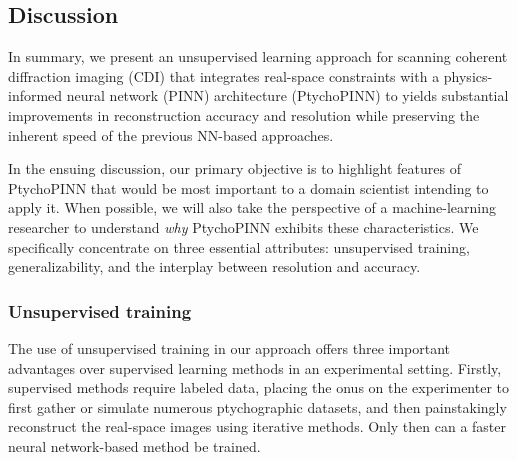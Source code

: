 \documentclass[sn-mathphys]{sn-jnl}%
\theoremstyle{thmstyleone}%
\theoremstyle{thmstyletwo}%
\theoremstyle{thmstylethree}%
\begin{document}
\subsection{Discussion}
In summary, we present an unsupervised learning approach for scanning coherent diffraction imaging (CDI) that integrates real-space constraints with a physics-informed neural network (PINN) architecture (PtychoPINN) to yields substantial improvements in reconstruction accuracy and resolution while preserving the inherent speed of the previous NN-based approaches. 

In the ensuing discussion, our primary objective is to highlight features of PtychoPINN  that would be most important to a domain scientist intending to apply it. When possible, we will also take the perspective of a machine-learning researcher to understand \emph{why} PtychoPINN exhibits these characteristics. We specifically concentrate on three essential attributes: unsupervised training, generalizability, and the interplay between resolution and accuracy.

\subsubsection{Unsupervised training} 
The use of unsupervised training in our approach offers three important advantages over supervised learning methods in an experimental setting. Firstly, supervised methods require labeled data, placing the onus on the experimenter to first gather or simulate numerous ptychographic datasets, and then painstakingly reconstruct the real-space images using iterative methods. Only then can a faster neural network-based method be trained.
\end{document}
